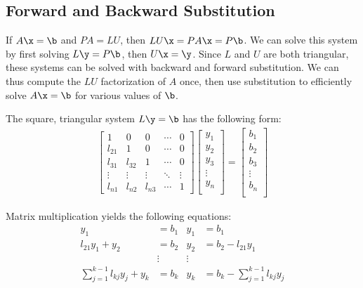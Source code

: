 \subsection*{Forward and Backward Substitution} %

If $A\x = \b$ and $PA = LU$, then $LU\x = PA\x = P\b$.
We can solve this system by first solving $L\y = P\b$, then $U\x = \y$.
Since $L$ and $U$ are both triangular, these systems can be solved with backward and forward substitution.
We can thus compute the $LU$ factorization of $A$ once, then use substitution to efficiently solve $A\x=\b$ for various values of $\b$.

The square, triangular system $L\y = \b$ has the following form:
%
\begin{align*}
\left[\begin{array}{ccccc}
1      & 0      & 0      & \cdots & 0 \\
l_{21} & 1      & 0      & \cdots & 0 \\
l_{31} & l_{32} & 1      & \cdots & 0 \\
\vdots & \vdots & \vdots & \ddots & \vdots \\
l_{n1} & l_{n2} & l_{n3} & \cdots & 1
\end{array}\right]
\left[\begin{array}{c}
y_1 \\ y_2 \\ y_3 \\ \vdots \\ y_n \\
\end{array}\right]
=
\left[\begin{array}{c}
b_1 \\ b_2 \\ b_3 \\ \vdots \\ b_n \\
\end{array}\right]
\end{align*}

Matrix multiplication yields the following equations:
%
\begin{align}
\nonumber y_1 &= b_1 & y_1 &= b_1 \\
\nonumber l_{21}y_1 + y_2 &= b_2 & y_2 &= b_2 - l_{21}y_1 \\
\nonumber & \vdots & \vdots & \\
\sum_{j=1}^{k-1}l_{kj}y_j + y_k &= b_k & y_k &= b_k - \sum_{j=1}^{k-1}l_{kj}y_j
\label{eq:forward-substitution}
\end{align}


